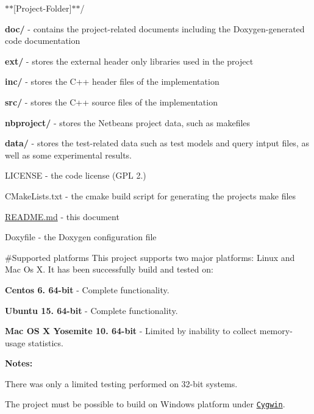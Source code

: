 \begin{DoxyItemize}
\item $\ast$$\ast$\mbox{[}Project-\/\+Folder\mbox{]}$\ast$$\ast$/
\begin{DoxyItemize}
\item {\bfseries doc/} -\/ contains the project-\/related documents including the Doxygen-\/generated code documentation
\item {\bfseries ext/} -\/ stores the external header only libraries used in the project
\item {\bfseries inc/} -\/ stores the C++ header files of the implementation
\item {\bfseries src/} -\/ stores the C++ source files of the implementation
\item {\bfseries nbproject/} -\/ stores the Netbeans project data, such as makefiles
\item {\bfseries data/} -\/ stores the test-\/related data such as test models and query intput files, as well as some experimental results.
\item L\+I\+C\+E\+N\+S\+E -\/ the code license (G\+P\+L 2.)
\item C\+Make\+Lists.\+txt -\/ the cmake build script for generating the project\textquotesingle{}s make files
\item \hyperlink{_r_e_a_d_m_e_8md}{R\+E\+A\+D\+M\+E.\+md} -\/ this document
\item Doxyfile -\/ the Doxygen configuration file
\end{DoxyItemize}
\end{DoxyItemize}

\#\+Supported platforms This project supports two major platforms\+: Linux and Mac Os X. It has been successfully build and tested on\+:


\begin{DoxyItemize}
\item {\bfseries Centos 6. 64-\/bit} -\/ Complete functionality.
\item {\bfseries Ubuntu 15. 64-\/bit} -\/ Complete functionality.
\item {\bfseries Mac O\+S X Yosemite 10. 64-\/bit} -\/ Limited by inability to collect memory-\/usage statistics.
\end{DoxyItemize}

{\bfseries Notes\+:}


\begin{DoxyEnumerate}
\item There was only a limited testing performed on 32-\/bit systems.
\item The project must be possible to build on Windows platform under \href{https://www.cygwin.com/}{\tt Cygwin}.
\end{DoxyEnumerate}

